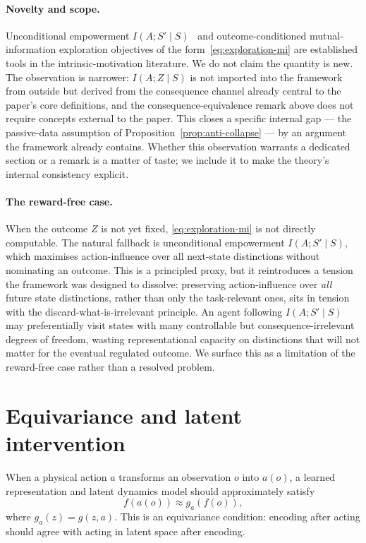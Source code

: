 \documentclass[11pt]{article}
\theoremstyle{remark}
\newcommand{\1}{\mathbb 1}
\begin{document}
\paragraph{Novelty and scope.}
Unconditional empowerment $I(A;S'\mid S)$~\citep{Klyubin-empowerment05} and outcome-conditioned mutual-information exploration objectives of the form~\eqref{eq:exploration-mi} are established tools in the intrinsic-motivation literature. We do not claim the quantity is new. The observation is narrower: $I(A;Z\mid S)$ is not imported into the framework from outside but derived from the consequence channel already central to the paper's core definitions, and the consequence-equivalence remark above does not require concepts external to the paper. This closes a specific internal gap --- the passive-data assumption of Proposition~\ref{prop:anti-collapse} --- by an argument the framework already contains. Whether this observation warrants a dedicated section or a remark is a matter of taste; we include it to make the theory's internal consistency explicit.

\paragraph{The reward-free case.}
When the outcome $Z$ is not yet fixed, \eqref{eq:exploration-mi} is not directly computable. The natural fallback is unconditional empowerment $I(A;S'\mid S)$, which maximises action-influence over all next-state distinctions without nominating an outcome. This is a principled proxy, but it reintroduces a tension the framework was designed to dissolve: preserving action-influence over \emph{all} future state distinctions, rather than only the task-relevant ones, sits in tension with the discard-what-is-irrelevant principle. An agent following $I(A;S'\mid S)$ may preferentially visit states with many controllable but consequence-irrelevant degrees of freedom, wasting representational capacity on distinctions that will not matter for the eventual regulated outcome. We surface this as a limitation of the reward-free case rather than a resolved problem.

\section{Equivariance and latent intervention}

When a physical action $a$ transforms an observation $o$ into $a(o)$, a learned representation and latent dynamics model should approximately satisfy
\begin{equation}
    f(a(o)) \approx g_a(f(o)),
    \label{eq:equivariance}
\end{equation}
where $g_a(z)=g(z,a)$. This is an equivariance condition: encoding after acting should agree with acting in latent space after encoding.
\end{document}
